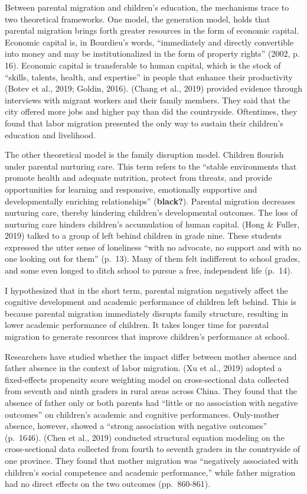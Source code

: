 \documentclass[
  man]{apa7}
\begin{document}
Between parental migration and children's education, the mechanisms trace to two theoretical frameworks. One model, the generation model, holds that parental migration brings forth greater resources in the form of economic capital. Economic capital is, in Bourdieu's words, ``immediately and directly convertible into money and may be institutionalized in the form of property rights'' (2002, p. 16). Economic capital is transferable to human capital, which is the stock of ``skills, talents, health, and expertise'' in people that enhance their productivity (Botev et al., 2019; Goldin, 2016). (Chang et al., 2019) provided evidence through interviews with migrant workers and their family members. They said that the city offered more jobs and higher pay than did the countryside. Oftentimes, they found that labor migration presented the only way to sustain their children's education and livelihood.

The other theoretical model is the family disruption model. Children flourish under parental nurturing care. This term refers to the ``stable environments that promote health and adequate nutrition, protect from threats, and provide opportunities for learning and responsive, emotionally supportive and developmentally enriching relationships'' (\textbf{black?}). Parental migration decreases nurturing care, thereby hindering children's developmental outcomes. The loss of nurturing care hinders children's accumulation of human capital. (Hong \& Fuller, 2019) talked to a group of left behind children in grade nine. These students expressed the utter sense of loneliness ``with no advocate, no support and with no one looking out for them'' (p.~13). Many of them felt indifferent to school grades, and some even longed to ditch school to pursue a free, independent life (p.~14).

I hypothesized that in the short term, parental migration negatively affect the cognitive development and academic performance of children left behind. This is because parental migration immediately disrupts family structure, resulting in lower academic performance of children. It takes longer time for parental migration to generate resources that improve children's performance at school.

Researchers have studied whether the impact differ between mother absence and father absence in the context of labor migration. (Xu et al., 2019) adopted a fixed-effects propensity score weighting model on cross-sectional data collected from seventh and ninth graders in rural areas across China. They found that the absence of father only or both parents had ``little or no association with negative outcomes'' on children's academic and cognitive performances. Only-mother absence, however, showed a ``strong association with negative outcomes'' (p.~1646). (Chen et al., 2019) conducted structural equation modeling on the cross-sectional data collected from fourth to seventh graders in the countryside of one province. They found that mother migration was ``negatively associated with children's social competence and academic performance,'' while father migration had no direct effects on the two outcomes (pp.~860-861).
\end{document}
